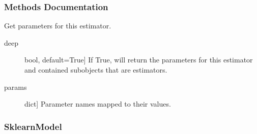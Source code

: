 \documentclass[letterpaper,10pt,english]{sphinxmanual}
\begin{document}
\begin{fulllineitems}
\subsubsection*{Methods Documentation}

\begin{fulllineitems}
\label{\detokenize{api/mastml.models.EnsembleModel:mastml.models.EnsembleModel.fit}}
\end{fulllineitems}


\begin{fulllineitems}
\label{\detokenize{api/mastml.models.EnsembleModel:mastml.models.EnsembleModel.get_params}}
Get parameters for this estimator.
\begin{description}
\item[{deep}] \leavevmode{[}bool, default=True{]}
If True, will return the parameters for this estimator and
contained subobjects that are estimators.

\end{description}
\begin{description}
\item[{params}] \leavevmode{[}dict{]}
Parameter names mapped to their values.

\end{description}

\end{fulllineitems}


\begin{fulllineitems}
\label{\detokenize{api/mastml.models.EnsembleModel:mastml.models.EnsembleModel.predict}}
\end{fulllineitems}


\end{fulllineitems}



\subsubsection{SklearnModel}
\label{\detokenize{api/mastml.models.SklearnModel:sklearnmodel}}\label{\detokenize{api/mastml.models.SklearnModel::doc}}
\end{document}

